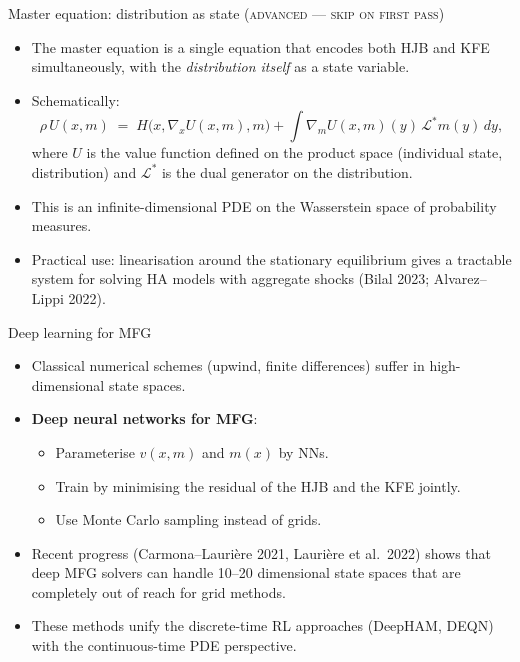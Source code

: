 \begin{frame}{Master equation: distribution as state \textsc{(advanced --- skip on first pass)}}
\begin{itemize}
\item The master equation is a single equation that encodes both HJB and KFE simultaneously, with the \emph{distribution itself} as a state variable.
\medskip
\item Schematically:
\[
\rho\, U(x, m) \;=\; H\!\big(x, \nabla_x U(x,m), m\big) + \int \nabla_m U(x,m)(y)\, \mathcal L^* m(y)\, dy,
\]
where $U$ is the value function defined on the product space (individual state, distribution) and $\mathcal L^*$ is the dual generator on the distribution.
\medskip
\item This is an infinite-dimensional PDE on the Wasserstein space of probability measures.
\medskip
\item Practical use: linearisation around the stationary equilibrium gives a tractable system for solving HA models with aggregate shocks (Bilal 2023; Alvarez--Lippi 2022).
\end{itemize}
\end{frame}

\begin{frame}{Deep learning for MFG}
\begin{itemize}
\item Classical numerical schemes (upwind, finite differences) suffer in high-dimensional state spaces.
\medskip
\item \textbf{Deep neural networks for MFG}:
  \begin{itemize}
  \item Parameterise $v(x, m)$ and $m(x)$ by NNs.
  \item Train by minimising the residual of the HJB and the KFE jointly.
  \item Use Monte Carlo sampling instead of grids.
  \end{itemize}
\medskip
\item Recent progress (Carmona--Lauri\`ere 2021, Lauri\`ere et al.\ 2022) shows that deep MFG solvers can handle 10--20 dimensional state spaces that are completely out of reach for grid methods.
\medskip
\item These methods unify the discrete-time RL approaches (DeepHAM, DEQN) with the continuous-time PDE perspective.
\end{itemize}
\end{frame}

